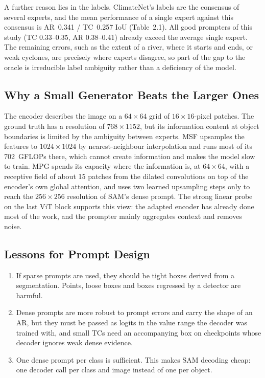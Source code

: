 A further reason lies in the labels. ClimateNet's labels are the consensus of several experts, and the mean performance
of a single expert against this consensus is AR~0.341 / TC~0.257 IoU (Table~2.1). All good prompters of this study
(TC 0.33--0.35, AR 0.38--0.41) already exceed the average single expert. The remaining errors, such as the extent of a
river, where it starts and ends, or weak cyclones, are precisely where experts disagree, so part of the gap to the
oracle is irreducible label ambiguity rather than a deficiency of the model.

\subsection{Why a Small Generator Beats the Larger Ones}

The encoder describes the image on a $64\times64$ grid of $16\times16$-pixel patches. The ground truth has a resolution
of $768\times1152$, but its information content at object boundaries is limited by the ambiguity between experts. MSF
upsamples the features to $1024\times1024$ by nearest-neighbour interpolation and runs most of its 702~GFLOPs there,
which cannot create information and makes the model slow to train. MPG spends its capacity where the information is, at
$64\times64$, with a receptive field of about 15 patches from the dilated convolutions on top of the encoder's own global
attention, and uses two learned upsampling steps only to reach the $256\times256$ resolution of SAM's dense prompt. The
strong linear probe on the last ViT block supports this view: the adapted encoder has already done most of the work,
and the prompter mainly aggregates context and removes noise.

\subsection{Lessons for Prompt Design}

\begin{enumerate}
  \item If sparse prompts are used, they should be tight boxes derived from a segmentation. Points, loose boxes and
  boxes regressed by a detector are harmful.
  \item Dense prompts are more robust to prompt errors and carry the shape of an AR, but they must be passed as logits
  in the value range the decoder was trained with, and small TCs need an accompanying box on checkpoints whose decoder
  ignores weak dense evidence.
  \item One dense prompt per class is sufficient. This makes SAM decoding cheap: one decoder call per class and image
  instead of one per object.
\end{enumerate}

